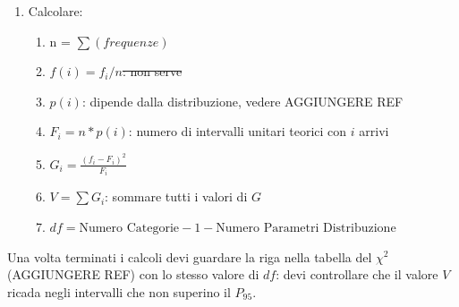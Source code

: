 \begin{enumerate}
\begin{itemize}
\begin{figure}[H]
                    \end{figure}
          \end{itemize}
    \item Calcolare:
          \begin{enumerate}
              \item n = $\sum(frequenze)$
              \item \st{$f(i) = f_i / n$: non serve}
              \item $p(i)$: dipende dalla distribuzione, vedere AGGIUNGERE
                    REF
              \item $F_i = n * p(i)$: numero di intervalli unitari teorici
                    con $i$ arrivi
              \item $G_i = \frac{(f_i - F_i)^2}{F_i}$
              \item $V = \sum G_i$: sommare tutti i valori di $G$
              \item $df = \text{Numero Categorie} - 1 - \text{Numero
                            Parametri Distribuzione}$
          \end{enumerate}
\end{enumerate}

Una volta terminati i calcoli devi guardare la riga nella tabella del $\chi^2$
(AGGIUNGERE REF) con lo stesso valore di $df$: devi controllare che il valore
$V$ ricada negli intervalli che non superino il $P_{95}$.
